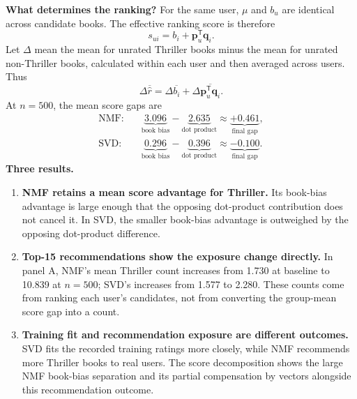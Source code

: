 \documentclass[10pt]{article}
\begin{document}
\begin{minipage}[t]{0.51\textwidth}
\textbf{What determines the ranking?} For the same user, $\mu$ and $b_u$ are identical across candidate books. The effective ranking score is therefore
\[
s_{ui}=b_i+\mathbf p_u^{\mathsf T}\mathbf q_i.
\]
Let $\Delta$ mean the mean for unrated Thriller books minus the mean for unrated non-Thriller books, calculated within each user and then averaged across users. Thus
\[
\Delta\overline{\hat r}=\Delta\overline{b_i}
+\Delta\overline{\mathbf p_u^{\mathsf T}\mathbf q_i}.
\]
At $n=500$, the mean score gaps are
\begin{align*}
\text{NMF:}\quad &\underbrace{3.096}_{\text{book bias}}-\underbrace{2.635}_{\text{dot product}}\approx\underbrace{+0.461}_{\text{final gap}},\\
\text{SVD:}\quad &\underbrace{0.296}_{\text{book bias}}-\underbrace{0.396}_{\text{dot product}}\approx\underbrace{-0.100}_{\text{final gap}}.
\end{align*}
\textbf{Three results.}
\begin{enumerate}[leftmargin=*,itemsep=3pt,topsep=3pt]
\item \textbf{NMF retains a mean score advantage for Thriller.} Its book-bias advantage is large enough that the opposing dot-product contribution does not cancel it. In SVD, the smaller book-bias advantage is outweighed by the opposing dot-product difference.
\item \textbf{Top-15 recommendations show the exposure change directly.} In panel A, NMF's mean Thriller count increases from 1.730 at baseline to 10.839 at $n=500$; SVD's increases from 1.577 to 2.280. These counts come from ranking each user's candidates, not from converting the group-mean score gap into a count.
\item \textbf{Training fit and recommendation exposure are different outcomes.} SVD fits the recorded training ratings more closely, while NMF recommends more Thriller books to real users. The score decomposition shows the large NMF book-bias separation and its partial compensation by vectors alongside this recommendation outcome.
\end{enumerate}
\end{minipage}
\end{document}
